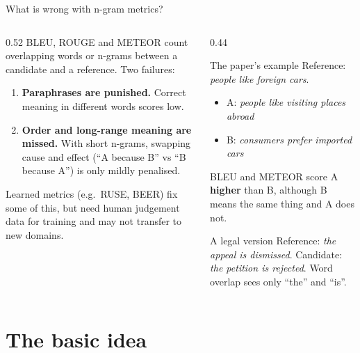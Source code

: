 \documentclass[aspectratio=169,11pt]{beamer}
\begin{document}
\begin{frame}{What is wrong with n-gram metrics?}
  \begin{columns}[T]
    \begin{column}{0.52\textwidth}
      \small
      BLEU, ROUGE and METEOR count overlapping words or n-grams between a candidate and a reference. Two failures:
      \begin{enumerate}
        \item \textbf{Paraphrases are punished.} Correct meaning in different words scores low.
        \item \textbf{Order and long-range meaning are missed.} With short n-grams, swapping cause and effect (``A because B'' vs ``B because A'') is only mildly penalised.
      \end{enumerate}
      \vspace{1mm}
      Learned metrics (e.g.\ RUSE, BEER) fix some of this, but need human judgement data for training and may not transfer to new domains.
    \end{column}
    \begin{column}{0.44\textwidth}
      \begin{exampleblock}{The paper's example}
        \small
        Reference: \emph{people like foreign cars}.
        \begin{itemize}
          \item A: \emph{people like visiting places abroad}
          \item B: \emph{consumers prefer imported cars}
        \end{itemize}
        BLEU and METEOR score A \textbf{higher} than B, although B means the same thing and A does not.
      \end{exampleblock}
      \begin{exampleblock}{A legal version}
        \small
        Reference: \emph{the appeal is dismissed}.
        Candidate: \emph{the petition is rejected}.
        Word overlap sees only ``the'' and ``is''.
      \end{exampleblock}
    \end{column}
  \end{columns}
\end{frame}

\section{The basic idea}
\end{document}
